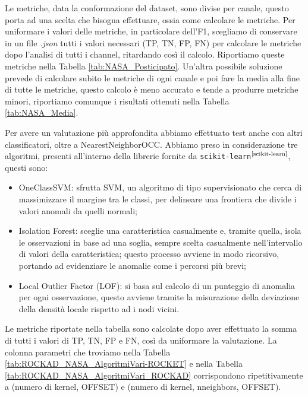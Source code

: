 Le metriche, data la conformazione del dataset, sono divise per canale, questo porta ad una scelta che bisogna effettuare, ossia come calcolare le metriche.
Per uniformare i valori delle metriche, in particolare dell'F1, scegliamo di conservare in un file \textit{.json} tutti i valori necessari (TP, TN, FP, FN) per calcolare le metriche dopo l'analisi di tutti i channel, ritardando così il calcolo.
Riportiamo queste metriche nella Tabella \ref{tab:NASA_Posticipato}.
Un'altra possibile soluzione prevede di calcolare subito le metriche di ogni canale e poi fare la media alla fine di tutte le metriche, questo calcolo è meno accurato e tende a produrre metriche minori, riportiamo comunque i risultati ottenuti nella Tabella \ref{tab:NASA_Media}.


\pagebreak

Per avere un valutazione più approfondita abbiamo effettuato test anche con altri classificatori, oltre a NearestNeighborOCC.
Abbiamo preso in considerazione tre algoritmi, presenti all'interno della librerie fornite da \texttt{scikit-learn}$^{\text{\cite{scikit-learn}}}$, questi sono:
\begin{itemize}
    \item OneClassSVM: sfrutta SVM, un algoritmo di tipo supervisionato che cerca di massimizzare il margine tra le classi, per delineare una frontiera che divide i valori anomali da quelli normali;
    \item Isolation Forest: sceglie una caratteristica casualmente e, tramite quella, isola le osservazioni in base ad una soglia, sempre scelta casualmente nell'intervallo di valori della caratteristica; questo processo avviene in modo ricorsivo, portando ad evidenziare le anomalie come i percorsi più brevi;
    \item Local Outlier Factor (LOF): si basa sul calcolo di un punteggio di anomalia per ogni osservazione, questo avviene tramite la misurazione della deviazione della densità locale rispetto ad i nodi vicini.
\end{itemize}

Le metriche riportate nella tabella sono calcolate dopo aver effettuato la somma di tutti i valori di TP, TN, FP e FN, così da uniformare la valutazione.
La colonna parametri che troviamo nella Tabella \ref{tab:ROCKAD_NASA_AlgoritmiVari-ROCKET} e nella Tabella \ref{tab:ROCKAD_NASA_AlgoritmiVari_ROCKAD} corrispondono ripetitivamente a (numero di kernel, OFFSET) e (numero di kernel, n\textunderscore neighbors, OFFSET).

\pagebreak

